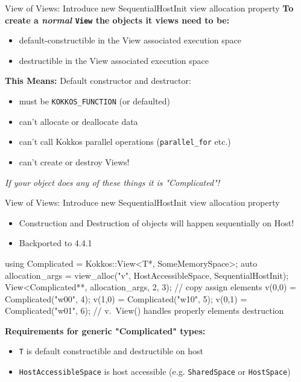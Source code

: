 \begin{frame}[fragile]{View of Views: Introduce new SequentialHostInit view allocation property}
\textbf{To create a \textit{normal} \texttt{View} the objects it views need to be:}
\begin{itemize}
  \item default-constructible in the View associated execution space
  \item destructible in the View associated execution space 
\end{itemize}

\vspace{10pt}

\textbf{This Means:} Default constructor and destructor:
\begin{itemize}
\item{must be \texttt{KOKKOS\_FUNCTION} (or defaulted)}
\item{can't allocate or deallocate data}
\item{can't call Kokkos parallel operations (\texttt{parallel\_for} etc.)}
\item{can't create or destroy Views!}
\end{itemize}

\vspace{10pt}
\begin{center}
\textit{If your object does any of these things it is "Complicated"!}
\end{center}

\end{frame}


\begin{frame}[fragile]{View of Views: Introduce new SequentialHostInit view allocation property}

\begin{itemize}
\item Construction and Destruction of objects will happen sequentially on Host!
\item Backported to 4.4.1
\end{itemize}

\begin{code}
using Complicated = Kokkos::View<T*, SomeMemorySpace>;
auto allocation_args = view_alloc("v", HostAccessibleSpace, SequentialHostInit);
View<Complicated**, allocation_args, 2, 3);
// copy assign elements
v(0,0) = Complicated("w00", 4);
v(1,0) = Complicated("w10", 5);
v(0,1) = Complicated("w01", 6);
// v.~View() handles properly elements destruction
\end{code}

\vspace{10pt}
\textbf{Requirements for generic "Complicated" types:}
\begin{itemize}
\item \texttt{T} is default constructible and destructible on host
\item \texttt{HostAccessibleSpace} is host accessible (e.g. \texttt{SharedSpace} or \texttt{HostSpace})
\end{itemize}
\end{frame}

